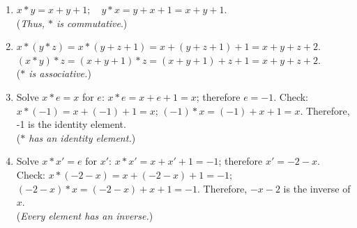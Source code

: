 \documentclass[twoside]{amsart}
\newcommand{\brk}{\vspace{5pt}}
\begin{document}
\brk
\begin{enumerate}[label=\protect{(\roman*)}]
\item $x * y = x + y + 1;\quad y * x = y + x + 1 = x + y + 1$. \\
  (\emph{Thus, $*$ is commutative}.)

\item $x * (y * z) = x * (y + z + 1) = x + (y + z + 1) + 1 = x + y + z
  + 2$.  $(x * y) * z = (x + y + 1) * z = (x + y + 1) + z + 1 = x + y
  + z +
  2$. \\
  (\emph{$*$ is associative.})

\item Solve $x * e = x$ for $e$: $x * e = x + e + 1 = x$; therefore $e
  = -1$. Check: $x * (-1) = x + (-1) + 1 = x$; $(-1) * x = (-1) +
  x + 1 = x$. Therefore, -1 is the identity element. \\
  (\emph{$*$ has an identity element.})

\item Solve $x * x' = e$ for $x'$: $x * x' = x + x' + 1 = -1$;
  therefore $x' = -2 - x$. Check: $x * (-2 - x) = x + (-2 - x) + 1 =
  -1$; $(-2 - x) * x = (-2 - x) + x + 1 = -1$. Therefore, $-x - 2$
  is the inverse of $x$. \\
  (\emph{Every element has an inverse.})

\end{enumerate} \brk
\end{document}
